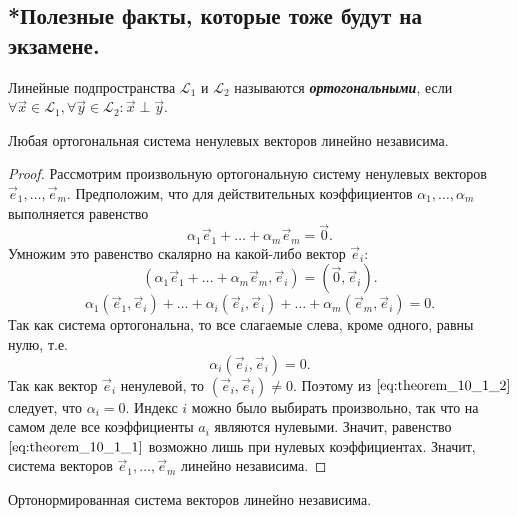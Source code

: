\subsection{
    *Полезные факты, которые тоже будут на экзамене.
}

\begin{definition}
    Линейные подпространства $\mathcal{L}_1$ и $\mathcal{L}_2$ называются \textbf{\textit{ортогональными}}, если $\forall \vec{x} \in \mathcal{L}_1, \forall \vec{y} \in \mathcal{L}_2 \colon \vec{x} \perp \vec{y}$.
\end{definition}

\begin{theorem}
    Любая ортогональная система ненулевых векторов линейно независима.
\end{theorem}

\begin{proof}
    Рассмотрим произвольную ортогональную систему ненулевых векторов $\vec{e}_1, \ldots, \vec{e}_m$. Предположим, что для действительных коэффициентов $\alpha_1, \ldots, \alpha_m$ выполняется равенство
    \begin{equation}
        \alpha_1\vec{e}_1 + \ldots + \alpha_m\vec{e}_m = \vec{0}.
        \label{eq:theorem_10_1_1}
    \end{equation}
    Умножим это равенство скалярно на какой-либо вектор $\vec{e}_i$:
    $$(\alpha_1\vec{e}_1 + \ldots + \alpha_m\vec{e}_m, \vec{e}_i) = (\vec{0}, \vec{e}_i).$$
    $$\alpha_1(\vec{e}_1, \vec{e}_i) + \ldots + \alpha_i(\vec{e}_i, \vec{e}_i) + \ldots + \alpha_m(\vec{e}_m, \vec{e}_i) = 0.$$
    Так как система ортогональна, то все слагаемые слева, кроме одного, равны нулю, т.е.
    \begin{equation}
        \alpha_i(\vec{e}_i, \vec{e}_i) = 0.
        \label{eq:theorem_10_1_2}
    \end{equation}
    Так как вектор $\vec{e}_i$ ненулевой, то $(\vec{e}_i, \vec{e}_i) \ne 0$. Поэтому из $\eqref{eq:theorem_10_1_2}$ следует, что $\alpha_i = 0$. Индекс $i$ можно было выбирать произвольно, так что на самом деле все коэффициенты $a_i$ являются нулевыми. Значит, равенство $\eqref{eq:theorem_10_1_1}$ возможно лишь при нулевых коэффициентах. Значит, система векторов $\vec{e}_1, \ldots, \vec{e}_m$ линейно независима.
\end{proof}

\begin{corollary}
    Ортонормированная система векторов линейно независима. 
\end{corollary}

